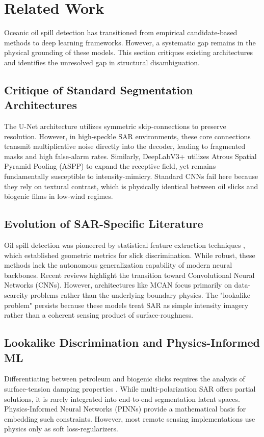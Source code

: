 \section{Related Work}
Oceanic oil spill detection has transitioned from empirical candidate-based methods to deep learning frameworks. However, a systematic gap remains in the physical grounding of these models. This section critiques existing architectures and identifies the unresolved gap in structural disambiguation.

\subsection{Critique of Standard Segmentation Architectures}
The U-Net architecture \cite{ronneberger2015unet} utilizes symmetric skip-connections to preserve resolution. However, in high-speckle SAR environments, these core connections transmit multiplicative noise directly into the decoder, leading to fragmented masks and high false-alarm rates. Similarly, DeepLabV3+ \cite{chen2018deeplabv3plus} utilizes Atrous Spatial Pyramid Pooling (ASPP) to expand the receptive field, yet remains fundamentally susceptible to intensity-mimicry. Standard CNNs fail here because they rely on textural contrast, which is physically identical between oil slicks and biogenic films in low-wind regimes.

\subsection{Evolution of SAR-Specific Literature}
Oil spill detection was pioneered by statistical feature extraction techniques \cite{solberg2007oil, brekke2005oil}, which established geometric metrics for slick discrimination. While robust, these methods lack the autonomous generalization capability of modern neural backbones. Recent reviews \cite{alruzouq2020sensors, zhu2017deep} highlight the transition toward Convolutional Neural Networks (CNNs). However, architectures like MCAN \cite{li2021mcan} focus primarily on data-scarcity problems rather than the underlying boundary physics. The "lookalike problem" persists because these models treat SAR as simple intensity imagery rather than a coherent sensing product of surface-roughness.

\subsection{Lookalike Discrimination and Physics-Informed ML}
Differentiating between petroleum and biogenic slicks requires the analysis of surface-tension damping properties \cite{topouzelis2007detection, skrunes2014oil}. While multi-polarization SAR offers partial solutions, it is rarely integrated into end-to-end segmentation latent spaces. Physics-Informed Neural Networks (PINNs) \cite{raissi2019pinn, karniadakis2021physics} provide a mathematical basis for embedding such constraints. However, most remote sensing implementations use physics only as soft loss-regularizers. 

